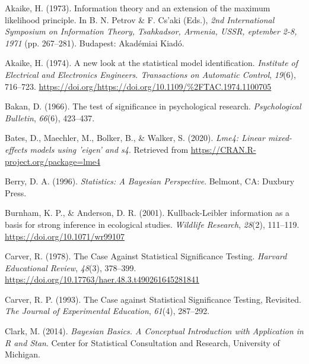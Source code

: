 \documentclass[
  english,
  doc]{apa6}
\newlength{\cslhangindent}
\newenvironment{cslreferences}%
  {\setlength{\parindent}{0pt}%
  \everypar{\setlength{\hangindent}{\cslhangindent}}\ignorespaces}%
  {\par}
\begin{document}
\hypertarget{refs}{}
\begin{cslreferences}
\leavevmode\hypertarget{ref-AkaikeInformationtheoryextension1973}{}%
Akaike, H. (1973). Information theory and an extension of the maximum likelihood principle. In B. N. Petrov \& F. Cs\a'aki (Eds.), \emph{2nd International Symposium on Information Theory, Tsahkadsor, Armenia, USSR, eptember 2-8, 1971} (pp. 267--281). Budapest: Akadémiai Kiadó.

\leavevmode\hypertarget{ref-akaikeNewLookStatistical1974}{}%
Akaike, H. (1974). A new look at the statistical model identification. \emph{Institute of Electrical and Electronics Engineers. Transactions on Automatic Control}, \emph{19}(6), 716--723. \url{https://doi.org/https://doi.org/10.1109/\%2FTAC.1974.1100705}

\leavevmode\hypertarget{ref-bakanTestSignificancePsychological1966}{}%
Bakan, D. (1966). The test of significance in psychological research. \emph{Psychological Bulletin}, \emph{66}(6), 423--437.

\leavevmode\hypertarget{ref-R-lme4}{}%
Bates, D., Maechler, M., Bolker, B., \& Walker, S. (2020). \emph{Lme4: Linear mixed-effects models using 'eigen' and s4}. Retrieved from \url{https://CRAN.R-project.org/package=lme4}

\leavevmode\hypertarget{ref-BerryStatisticsBayesianPerspective1996}{}%
Berry, D. A. (1996). \emph{Statistics: A Bayesian Perspective}. Belmont, CA: Duxbury Press.

\leavevmode\hypertarget{ref-BurnhamKullbackLeiblerinformationbasis2001}{}%
Burnham, K. P., \& Anderson, D. R. (2001). Kullback-Leibler information as a basis for strong inference in ecological studies. \emph{Wildlife Research}, \emph{28}(2), 111--119. \url{https://doi.org/10.1071/wr99107}

\leavevmode\hypertarget{ref-carverCaseStatisticalSignificance1978}{}%
Carver, R. (1978). The Case Against Statistical Significance Testing. \emph{Harvard Educational Review}, \emph{48}(3), 378--399. \url{https://doi.org/10.17763/haer.48.3.t490261645281841}

\leavevmode\hypertarget{ref-carverCaseStatisticalSignificance1993}{}%
Carver, R. P. (1993). The Case against Statistical Significance Testing, Revisited. \emph{The Journal of Experimental Education}, \emph{61}(4), 287--292.

\leavevmode\hypertarget{ref-ClarkBayesianBasicsConceptual2014}{}%
Clark, M. (2014). \emph{Bayesian Basics. A Conceptual Introduction with Application in R and Stan}. Center for Statistical Consultation and Research, University of Michigan.


\end{cslreferences}
\end{document}
